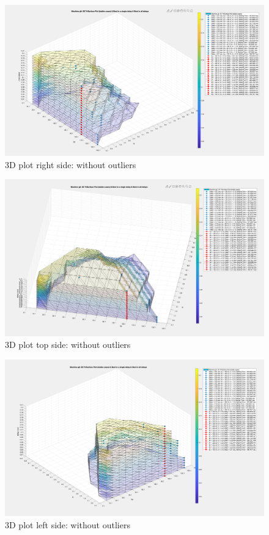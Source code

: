 \begin{figure}[htbp]
\centering
\includegraphics[width = .819\textwidth]{figure/5_4_1_without_Outlier2.png}
\caption{3D plot right side: without outliers}
\label{5_4_1_without_Outlier2}
\end{figure}


\begin{figure}[htbp]
\centering
\includegraphics[width = .819\textwidth]{figure/5_4_1_without_Outlier3.png}
\caption{3D plot top side: without outliers}
\label{5_4_1_without_Outlier3}
\end{figure}


\begin{figure}[htbp]
\centering
\includegraphics[width = .819\textwidth]{figure/5_4_1_without_Outlier4.png}
\caption{3D plot left side: without outliers}
\label{5_4_1_without_Outlier4}
\end{figure}


